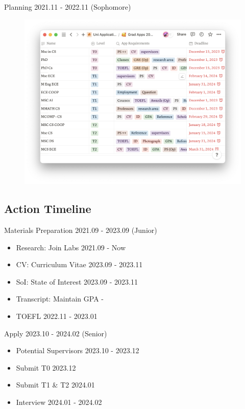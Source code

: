 \documentclass[UTF8]{beamer}
\begin{document}
\begin{frame}{Planning \hfill 2021.11 - 2022.11 \tiny{(Sophomore)}}
  \begin{figure}[h]
    \centering
    \includegraphics[width=.9\linewidth]{pic/SchoolList2.png}
  \end{figure}
\end{frame}

\subsection{Action Timeline}
\begin{frame}{Materials Preparation \hfill 2021.09 - 2023.09 \tiny{(Junior)}}
  \begin{itemize}
    \item Research: Join Labs \hfill 2021.09 - Now
    \item CV: Curriculum Vitae \hfill 2023.09 - 2023.11
    \item SoI: State of Interest \hfill 2023.09 - 2023.11
    \item Transcript: Maintain GPA \hfill -
    \item TOEFL   \hfill 2022.11 - 2023.01
  \end{itemize}
\end{frame}

\begin{frame}{Apply \hfill 2023.10 - 2024.02 \tiny{(Senior)}}
  \begin{itemize}
    \item Potential Supervisors \hfill 2023.10 - 2023.12
    \item Submit T0 \hfill 2023.12
    \item Submit T1 \& T2  \hfill 2024.01
    \item Interview \hfill 2024.01 - 2024.02
  \end{itemize}
\end{frame}
\end{document}
